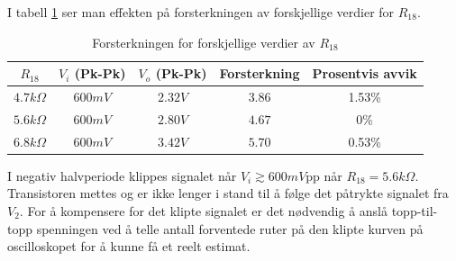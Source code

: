             I tabell \ref{tab:forsterkning_kollektormotstand_real} ser man effekten på forsterkningen av forskjellige verdier for $R_{18}$.
            \begin{table}[H] %
                \centering
                \caption{Forsterkningen for forskjellige verdier av $R_{18}$}
                \label{tab:forsterkning_kollektormotstand_real}
                \begin{tabular}{|c|c|c|c|c|}
                    \hline
                    \rowcolor[gray]{0.9}
                    \textbf{$R_{18}$} & \textbf{$V_i$ (Pk-Pk)} & \textbf{$V_o$ (Pk-Pk)} & \textbf{Forsterkning} & \textbf{Prosentvis avvik}\\ \hline
                    $4.7k\Omega$ & $600mV$ & $2.32V$ & $3.86$ & 1.53\% \\ \hline
                    $5.6k\Omega$ & $600mV$ & $2.80V$ & $4.67$ & 0\% \\ \hline
                    $6.8k\Omega$ & $600mV$ & $3.42V$ & $5.70$ & 0.53\% \\ \hline
                \end{tabular}
            \end{table}

            I negativ halvperiode klippes signalet når $V_i \gtrsim 600mV$pp når $R_{18} = 5.6k\Omega$. Transistoren mettes og er ikke lenger i stand til å følge det påtrykte signalet fra $V_2$. For å kompensere for det klipte signalet er det nødvendig å anslå topp-til-topp spenningen ved å telle antall forventede ruter på den klipte kurven på  oscilloskopet for å kunne få et reelt estimat. 

